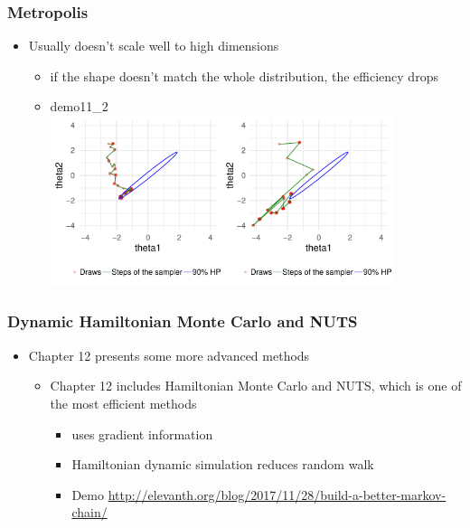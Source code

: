 \documentclass[10pt,handout]{beamer}
\begin{document}
\begin{frame}

\frametitle{ Metropolis}

  \begin{itemize}
  \item Usually doesn't scale well to high dimensions
    \begin{itemize}
    \item if the shape doesn't match the whole distribution, the efficiency drops
    \item demo11\_2\\
      \vspace{1\baselineskip}
      \hspace{-1cm}\includegraphics[width=5cm]{figs/Metrop2.pdf}\includegraphics[width=5cm]{figs/Metrop3.pdf}
    \end{itemize}
  \end{itemize}

\end{frame}


\begin{frame}

\frametitle{ Dynamic Hamiltonian Monte Carlo and NUTS}

  \begin{itemize}
  \item Chapter 12 presents some more advanced methods
    \begin{itemize}
    \item Chapter 12 includes Hamiltonian Monte Carlo and NUTS, which
      is one of the most efficient methods
      \begin{itemize}
      \item uses gradient information
      \item Hamiltonian dynamic simulation reduces random walk
   \item Demo {\small \url{http://elevanth.org/blog/2017/11/28/build-a-better-markov-chain/}}
      \end{itemize}
    \end{itemize}
  \end{itemize}

\end{frame}
\end{document}
